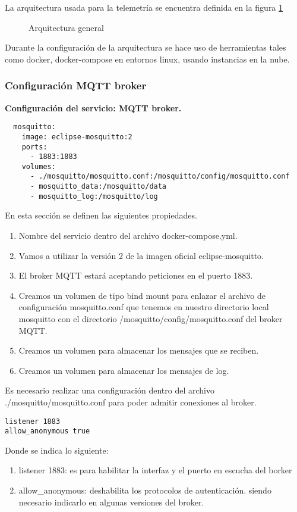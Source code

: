 La arquitectura usada para la telemetría se encuentra definida en la figura
\ref{fig:arquitectura_general_monitor}

\begin{figure}[H]
    \centering
    
    \caption{Arquitectura general}
    \label{fig:arquitectura_general_monitor}
\end{figure}


Durante la configuración de la arquitectura se hace uso de herramientas tales
como docker, docker-compose en entornos linux, usando instancias en la nube. 

\newpage
\subsubsection{Configuración MQTT broker}

\begin{flushleft}
  \textbf{Configuración del servicio: MQTT broker.}
\end{flushleft}

\begin{verbatim}
  mosquitto: 
    image: eclipse-mosquitto:2 
    ports:
      - 1883:1883 
    volumes:
      - ./mosquitto/mosquitto.conf:/mosquitto/config/mosquitto.conf 
      - mosquitto_data:/mosquitto/data 
      - mosquitto_log:/mosquitto/log 
\end{verbatim}

En esta sección se definen las siguientes propiedades. 
\begin{enumerate}
  \item Nombre del servicio dentro del archivo docker-compose.yml.
  \item Vamos a utilizar la versión 2 de la imagen oficial eclipse-mosquitto.
  \item El broker MQTT estará aceptando peticiones en el puerto 1883.
  \item Creamos un volumen de tipo bind mount para enlazar el archivo de
    configuración mosquitto.conf que tenemos en nuestro directorio local
    mosquitto con el directorio /mosquitto/config/mosquitto.conf del broker
    MQTT.
  \item Creamos un volumen para almacenar los mensajes que se reciben.
  \item Creamos un volumen para almacenar los mensajes de log.
\end{enumerate}

Es necesario realizar una configuración dentro del archivo
./mosquitto/mosquitto.conf para poder admitir conexiones al broker. 
\begin{verbatim}
listener 1883
allow_anonymous true
\end{verbatim}
Donde se indica lo siguiente: 
\begin{enumerate}
  \item{listener 1883: es para habilitar la interfaz y el puerto en escucha del
    borker}
  \item{allow\_anonymous: deshabilita los protocolos de autenticación. siendo
    necesario indicarlo en algunas versiones del broker. }
\end{enumerate}

